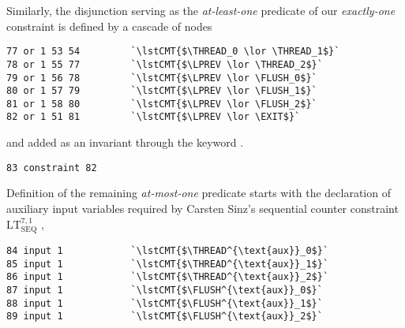 \noindent
Similarly, the disjunction serving as the \emph{at-least-one} predicate of our \emph{exactly-one} constraint is defined by a cascade of  nodes
\begin{lstlisting}[style=btor2]
77 or 1 53 54         `\lstCMT{$\THREAD_0 \lor \THREAD_1$}`
78 or 1 55 77         `\lstCMT{$\LPREV \lor \THREAD_2$}`
79 or 1 56 78         `\lstCMT{$\LPREV \lor \FLUSH_0$}`
80 or 1 57 79         `\lstCMT{$\LPREV \lor \FLUSH_1$}`
81 or 1 58 80         `\lstCMT{$\LPREV \lor \FLUSH_2$}`
82 or 1 51 81         `\lstCMT{$\LPREV \lor \EXIT$}`
\end{lstlisting}
and added as an invariant through the keyword .
\begin{lstlisting}[style=btor2]
83 constraint 82
\end{lstlisting}
Definition of the remaining \emph{at-most-one} predicate starts with the declaration of auxiliary input variables required by Carsten Sinz's sequential counter constraint $\text{LT}^{7, 1}_{\text{SEQ}}$ \cite{ref:Sinz},
\begin{lstlisting}[style=btor2]
84 input 1            `\lstCMT{$\THREAD^{\text{aux}}_0$}`
85 input 1            `\lstCMT{$\THREAD^{\text{aux}}_1$}`
86 input 1            `\lstCMT{$\THREAD^{\text{aux}}_2$}`
87 input 1            `\lstCMT{$\FLUSH^{\text{aux}}_0$}`
88 input 1            `\lstCMT{$\FLUSH^{\text{aux}}_1$}`
89 input 1            `\lstCMT{$\FLUSH^{\text{aux}}_2$}`
\end{lstlisting}
